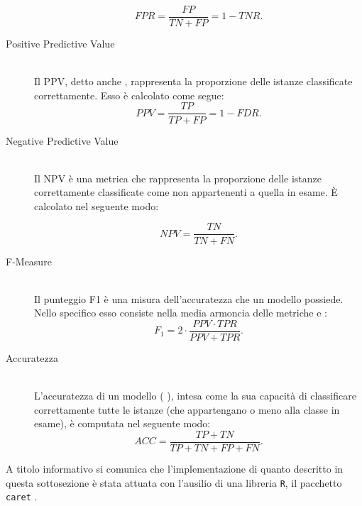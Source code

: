 \begin{description}
	\[FPR = \frac{FP}{TN + FP} = 1 - TNR\text{.}\]
	\item[Positive Predictive Value] \hfill \\
	Il \acf{PPV}, detto anche \emph{}, rappresenta la proporzione delle istanze classificate correttamente. Esso è calcolato come segue:
	\[PPV = \frac{TP}{TP + FP} = 1 - FDR\text{.}\]
	\item[Negative Predictive Value] \hfill \\
	Il \acf{NPV} è una metrica che rappresenta la proporzione delle istanze correttamente classificate come non appartenenti a quella in esame. \`E calcolato nel seguente modo:\par
	\[NPV = \frac{TN}{TN + FN}\text{.}\]
	\item[F-Measure] \hfill \\
	Il punteggio \acf{F1} è una misura dell'accuratezza che un modello possiede. Nello specifico esso consiste nella media armoncia delle metriche \emph{} e \emph{}:
	\[F_1 = 2 \cdot \frac{PPV \cdot TPR}{PPV + TPR}\text{.}\]
	\item[Accuratezza] \hfill \\
	L'accuratezza di un modello (\ie{} \emph{}), intesa come la sua capacità di classificare correttamente tutte le istanze (che appartengano o meno alla classe in esame), è computata nel seguente modo:
	\[ACC = \frac{TP + TN}{TP + TN + FP + FN}\text{.}\]
\end{description}

A titolo informativo si comunica che l'implementazione di quanto descritto in questa sottosezione è stata attuata con l'ausilio di una libreria \lstinline$R$, il pacchetto \lstinline$caret$ \citep{CARET2013}.

